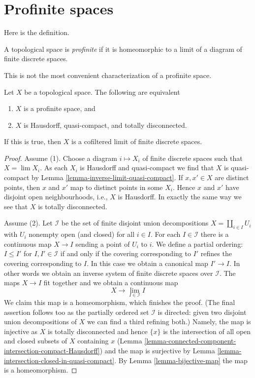 \section{Profinite spaces}
\label{section-profinite}

\noindent
Here is the definition.

\begin{definition}
\label{definition-profinite}
A topological space is {\it profinite} if it is homeomorphic to a limit
of a diagram of finite discrete spaces.
\end{definition}

\noindent
This is not the most convenient characterization of a profinite space.

\begin{lemma}
\label{lemma-profinite}
Let $X$ be a topological space.
The following are equivalent
\begin{enumerate}
\item $X$ is a profinite space, and
\item $X$ is Hausdorff, quasi-compact, and totally disconnected.
\end{enumerate}
If this is true, then $X$ is a cofiltered limit of finite discrete
spaces.
\end{lemma}

\begin{proof}
Assume (1). Choose a diagram $i \mapsto X_i$ of finite discrete spaces
such that $X = \lim X_i$. As each $X_i$ is Hausdorff and quasi-compact we find
that $X$ is quasi-compact by Lemma \ref{lemma-inverse-limit-quasi-compact}.
If $x, x' \in X$ are distinct points, then $x$ and $x'$ map to
distinct points in some $X_i$. Hence $x$ and $x'$ have disjoint
open neighbourhoods, i.e., $X$ is Hausdorff. In exactly the same way
we see that $X$ is totally disconnected.

\medskip\noindent
Assume (2). Let $\mathcal{I}$ be the set of finite disjoint union
decompositions $X = \coprod_{i \in I} U_i$ with $U_i$ nonempty open
(and closed) for all $i \in I$.
For each $I \in \mathcal{I}$ there is a continuous map
$X \to I$ sending a point of $U_i$ to $i$. We define a partial
ordering: $I \leq I'$ for $I, I' \in \mathcal{I}$ if and only
if the covering corresponding to $I'$ refines the covering corresponding
to $I$. In this case we obtain a canonical map $I' \to I$. In other
words we obtain an inverse system of finite discrete spaces over $\mathcal{I}$.
The maps $X \to I$ fit together and we obtain a continuous map
$$
X \longrightarrow \lim_{I \in \mathcal{I}} I
$$
We claim this map is a homeomorphism, which finishes the proof.
(The final assertion follows too as the partially ordered set
$\mathcal{I}$ is directed: given two disjoint union decompositions
of $X$ we can find a third refining both.)
Namely, the map is injective as $X$ is totally disconnected
and hence $\{x\}$ is the intersection of all open and closed subsets
of $X$ containing $x$
(Lemma \ref{lemma-connected-component-intersection-compact-Hausdorff})
and  the map is surjective by
Lemma \ref{lemma-intersection-closed-in-quasi-compact}.
By Lemma \ref{lemma-bijective-map} the map is a homeomorphism.
\end{proof}

